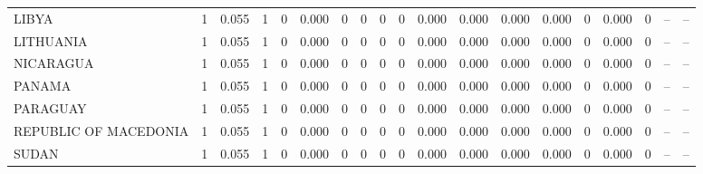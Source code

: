\begin{tabular}{lrrrrrrrrrrrrrrrrrr}
LIBYA & 1 & 0.055 & 1 & 0 & 0.000 & 0 & 0 & 0 & 0 & 0.000 & 0.000 & 0.000 & 0.000 & 0 & 0.000 & 0 & -- & -- \\
LITHUANIA & 1 & 0.055 & 1 & 0 & 0.000 & 0 & 0 & 0 & 0 & 0.000 & 0.000 & 0.000 & 0.000 & 0 & 0.000 & 0 & -- & -- \\
NICARAGUA & 1 & 0.055 & 1 & 0 & 0.000 & 0 & 0 & 0 & 0 & 0.000 & 0.000 & 0.000 & 0.000 & 0 & 0.000 & 0 & -- & -- \\
PANAMA & 1 & 0.055 & 1 & 0 & 0.000 & 0 & 0 & 0 & 0 & 0.000 & 0.000 & 0.000 & 0.000 & 0 & 0.000 & 0 & -- & -- \\
PARAGUAY & 1 & 0.055 & 1 & 0 & 0.000 & 0 & 0 & 0 & 0 & 0.000 & 0.000 & 0.000 & 0.000 & 0 & 0.000 & 0 & -- & -- \\
REPUBLIC OF MACEDONIA & 1 & 0.055 & 1 & 0 & 0.000 & 0 & 0 & 0 & 0 & 0.000 & 0.000 & 0.000 & 0.000 & 0 & 0.000 & 0 & -- & -- \\
SUDAN & 1 & 0.055 & 1 & 0 & 0.000 & 0 & 0 & 0 & 0 & 0.000 & 0.000 & 0.000 & 0.000 & 0 & 0.000 & 0 & -- & -- \\
\bottomrule
\end{tabular}
